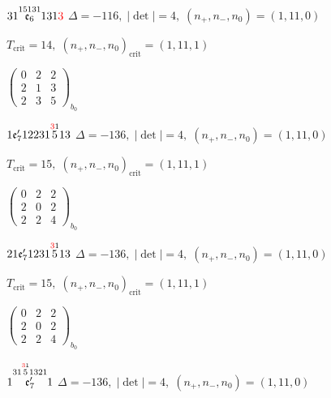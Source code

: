 \documentclass[10pt]{article}
\begin{document}
\smallskip

$31\overset{15131}{\mathfrak{e}_6}131\textcolor{red}{3}$ \quad $\Delta=-116,\; |\det|=4,\; (n_+,n_-,n_0)=(1,11,0)$

\hspace{1em}$T_{\text{crit}}=14,\; (n_+,n_-,n_0)_{\text{crit}}=(1,11,1)$

\hspace{2em}$\left(\begin{smallmatrix}0 & 2 & 2 \\ 2 & 1 & 3 \\ 2 & 3 & 5\end{smallmatrix}\right)_{\!b_0}$

\smallskip

$1\mathfrak{e}_7'12231\overset{\textcolor{red}{3}1}{5}13$ \quad $\Delta=-136,\; |\det|=4,\; (n_+,n_-,n_0)=(1,11,0)$

\hspace{1em}$T_{\text{crit}}=15,\; (n_+,n_-,n_0)_{\text{crit}}=(1,11,1)$

\hspace{2em}$\left(\begin{smallmatrix}0 & 2 & 2 \\ 2 & 0 & 2 \\ 2 & 2 & 4\end{smallmatrix}\right)_{\!b_0}$

\smallskip

$21\mathfrak{e}_7'1231\overset{\textcolor{red}{3}1}{5}13$ \quad $\Delta=-136,\; |\det|=4,\; (n_+,n_-,n_0)=(1,11,0)$

\hspace{1em}$T_{\text{crit}}=15,\; (n_+,n_-,n_0)_{\text{crit}}=(1,11,1)$

\hspace{2em}$\left(\begin{smallmatrix}0 & 2 & 2 \\ 2 & 0 & 2 \\ 2 & 2 & 4\end{smallmatrix}\right)_{\!b_0}$

\smallskip

$1\overset{31\overset{\textcolor{red}{3}1}{5}1321}{\mathfrak{e}_7'}1$ \quad $\Delta=-136,\; |\det|=4,\; (n_+,n_-,n_0)=(1,11,0)$
\end{document}
